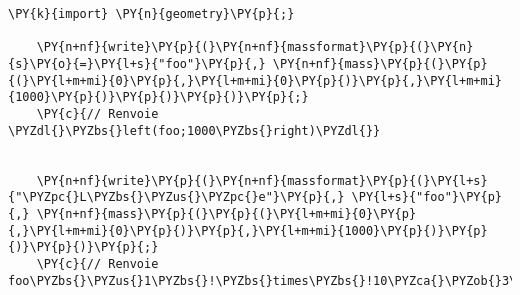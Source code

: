 \begin{Verbatim}[commandchars=\\\{\}]
    \PY{k}{import} \PY{n}{geometry}\PY{p}{;}

    \PY{n+nf}{write}\PY{p}{(}\PY{n+nf}{massformat}\PY{p}{(}\PY{n}{s}\PY{o}{=}\PY{l+s}{"foo"}\PY{p}{,} \PY{n+nf}{mass}\PY{p}{(}\PY{p}{(}\PY{l+m+mi}{0}\PY{p}{,}\PY{l+m+mi}{0}\PY{p}{)}\PY{p}{,}\PY{l+m+mi}{1000}\PY{p}{)}\PY{p}{)}\PY{p}{)}\PY{p}{;}
    \PY{c}{// Renvoie \PYZdl{}\PYZbs{}left(foo;1000\PYZbs{}right)\PYZdl{}}


    \PY{n+nf}{write}\PY{p}{(}\PY{n+nf}{massformat}\PY{p}{(}\PY{l+s}{"\PYZpc{}L\PYZbs{}\PYZus{}\PYZpc{}e"}\PY{p}{,} \PY{l+s}{"foo"}\PY{p}{,} \PY{n+nf}{mass}\PY{p}{(}\PY{p}{(}\PY{l+m+mi}{0}\PY{p}{,}\PY{l+m+mi}{0}\PY{p}{)}\PY{p}{,}\PY{l+m+mi}{1000}\PY{p}{)}\PY{p}{)}\PY{p}{)}\PY{p}{;}
    \PY{c}{// Renvoie foo\PYZbs{}\PYZus{}1\PYZbs{}!\PYZbs{}times\PYZbs{}!10\PYZca{}\PYZob{}3\PYZbs{}phantom\PYZob{}+\PYZcb{}\PYZcb{}}
\end{Verbatim}
